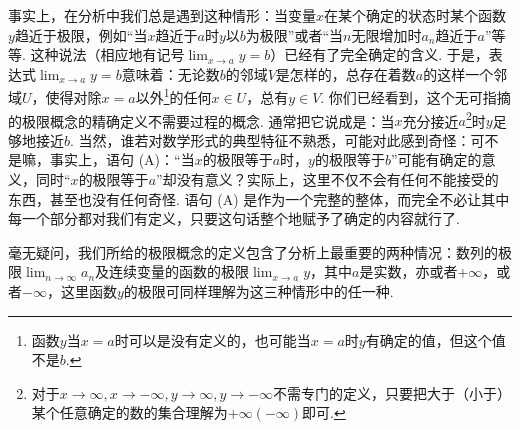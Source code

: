 \documentclass[color=cyan,mathpazo,titlestyle=hang]{elegantbook_mac}
\begin{document}
事实上，在分析中我们总是遇到这种情形：当变量$x$在某个确定的状态时某个函数$y$趋近于极限，例如``当$x$趋近于$a$时$y$以$b$为极限''或者``当$n$无限增加时$a_n$趋近于$a$''等等. 这种说法（相应地有记号$\lim_{x\to a} y = b$）已经有了完全确定的含义. 于是，表达式$\lim_{x\to a} y = b$意味着：无论数$b$的邻域$V$是怎样的，总存在着数$a$的这样一个邻域$U$，使得对除$x=a$以外\footnote{函数$y$当$x=a$时可以是没有定义的，也可能当$x=a$时$y$有确定的值，但这个值不是$b$.}的任何$x\in U$，总有$y\in V$. 你们已经看到，这个无可指摘的极限概念的精确定义不需要过程的概念. 通常把它说成是：当$x$充分接近$a$\footnote{对于$x\to \infty, x\to -\infty, y\to \infty, y\to -\infty$不需专门的定义，只要把大于（小于）某个任意确定的数的集合理解为$+\infty(-\infty)$即可.}时$y$足够地接近$b$. 当然，谁若对数学形式的典型特征不熟悉，可能对此感到奇怪：可不是嘛，事实上，语句 (A)：``当$x$的极限等于$a$时，$y$的极限等于$b$''可能有确定的意义，同时``$x$的极限等于$a$''却没有意义？实际上，这里不仅不会有任何不能接受的东西，甚至也没有任何奇怪. 语句 (A) 是作为一个完整的整体，而完全不必让其中每一个部分都对我们有定义，只要这句话整个地赋予了确定的内容就行了. 

毫无疑问，我们所给的极限概念的定义包含了分析上最重要的两种情况：数列的极限$\lim_{n\to \infty}a_n$及连续变量的函数的极限$\lim_{x\to a}y$，其中$a$是实数，亦或者$+\infty$，或者$-\infty$，这里函数$y$的极限可同样理解为这三种情形中的任一种. 

\begin{figure}[h]
\begin{minipage}{5cm}
\caption{}\label{m1}
\end{minipage}
\hfill
\begin{minipage}{5cm}
\caption{}\label{m2}
\end{minipage}
\end{figure}
\end{document}
